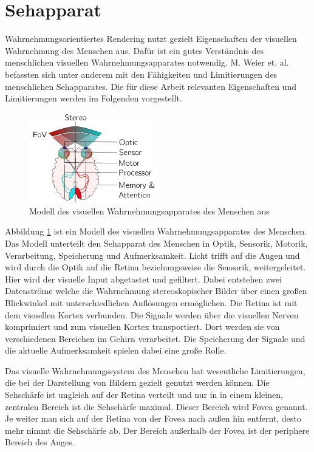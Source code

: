 \section{Sehapparat}\label{sec::eye}
Wahrnehmungsorientiertes Rendering nutzt gezielt Eigenschaften der visuellen Wahrnehmung des Menschen aus.
Dafür ist ein gutes Verständnis des menschlichen visuellen Wahrnehmungsapparates notwendig.
M. Weier et. al. \cite{doi:10.1111/cgf.13150} befassten sich unter anderem mit den Fähigkeiten und Limitierungen des menschlichen Sehapparates.
Die für diese Arbeit relevanten Eigenschaften und Limitierungen werden im Folgenden vorgestellt.
\begin{figure}
	\centering
	\includegraphics[width=0.5\textwidth]{../../Grafiken/HVS-model_from-star-report.png}
	\caption{Modell des visuellen Wahrnehmungsapparates des Menschen aus \cite{doi:10.1111/cfg.13150}}
	\label{fig::eye01}
\end{figure}
Abbildung \ref{fig::eye01} ist ein Modell des visuellen Wahrnehmungsapparates des Menschen.
Das Modell unterteilt den Sehapparat des Menschen in Optik, Sensorik, Motorik, Verarbeitung, Speicherung und Aufmerksamkeit.
Licht trifft auf die Augen und wird durch die Optik auf die Retina beziehungsweise die Sensorik, weitergeleitet.
Hier wird der visuelle Input abgetastet und gefiltert.
Dabei entstehen zwei Datenströme welche die Wahrnehmung stereoskopischer Bilder über einen großen Blickwinkel mit unterschiedlichen Auflösungen ermöglichen.
Die Retina ist mit dem visuellen Kortex verbunden.
Die Signale werden über die visuellen Nerven komprimiert und zum visuellen Kortex transportiert.
Dort werden sie von verschiedenen Bereichen im Gehirn verarbeitet.
Die Speicherung der Signale und die aktuelle Aufmerksamkeit spielen dabei eine große Rolle.

Das visuelle Wahrnehmungssystem des Menschen hat wesentliche Limitierungen, die bei der Darstellung von Bildern gezielt genutzt werden können.
Die Sehschärfe ist ungleich auf der Retina verteilt und nur in in einem kleinen, zentralen Bereich ist die Sehschärfe maximal.
Dieser Bereich wird Fovea genannt.
Je weiter man sich auf der Retina von der Fovea nach außen hin entfernt, desto mehr nimmt die Sehschärfe ab.
Der Bereich außerhalb der Fovea ist der periphere Bereich des Auges.


